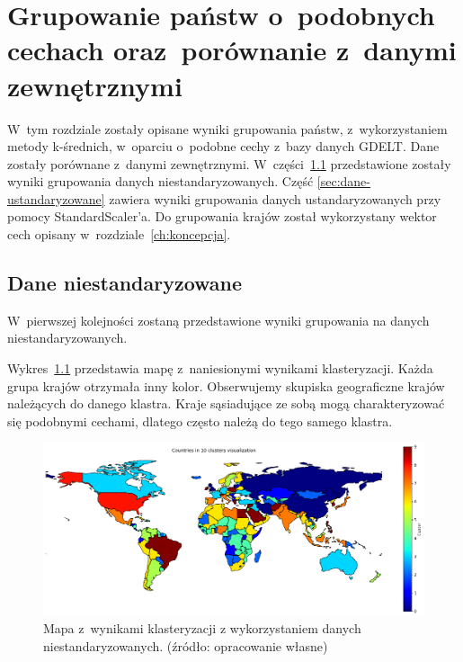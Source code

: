\documentclass[11pt]{report}
\begin{document}
    \chapter[Grupowanie państw]{Grupowanie państw o~podobnych cechach oraz~porównanie z~danymi zewnętrznymi}\label{ch:grupowanie-państw-opodobnych-cechach-orazporównanie-z-danymi-zewnętrznymi}

    W~tym rozdziale zostały opisane wyniki grupowania państw, z~wykorzystaniem metody k-średnich, w~oparciu o~podobne cechy z~bazy danych GDELT.
    Dane zostały porównane z~danymi zewnętrznymi.
    W~części~\ref{sec:dane-niestandaryzowane} przedstawione zostały wyniki grupowania danych niestandaryzowanych.
    Część \ref{sec:dane-ustandaryzowane} zawiera wyniki grupowania danych ustandaryzowanych przy pomocy StandardScaler'a.
    Do grupowania krajów został wykorzystany wektor cech opisany w~rozdziale~\ref{ch:koncepcja}.


    \section{Dane niestandaryzowane}\label{sec:dane-niestandaryzowane}
    W~pierwszej kolejności zostaną przedstawione wyniki grupowania na danych niestandaryzowanych.

    Wykres~\ref{fig:clust10} przedstawia mapę z~naniesionymi wynikami klasteryzacji.
    Każda grupa krajów otrzymała inny kolor.
    Obserwujemy skupiska geograficzne krajów należących do danego klastra.
    Kraje sąsiadujące ze sobą mogą charakteryzować się podobnymi cechami, dlatego często należą do tego samego klastra.

    \begin{figure}[!htp]
        \centering
        \includegraphics[width=\linewidth]{fig/CLUST/10clusterMap.png}
        \caption{Mapa z~wynikami klasteryzacji z wykorzystaniem danych niestandaryzowanych. (źródło: opracowanie własne)}
        \label{fig:clust10}
    \end{figure}
\end{document}

